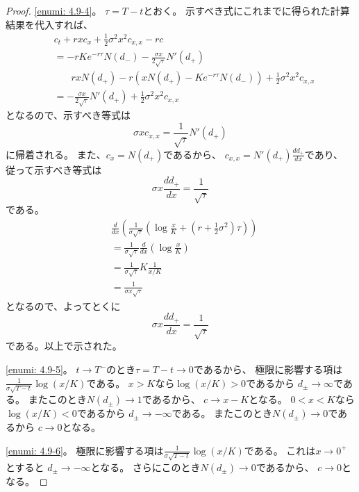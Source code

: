 \documentclass[uplatex]{jsarticle}
\theoremstyle{definition}
\begin{document}
\begin{proof}
  \ref{enumi: 4.9-4}。
  \(\tau = T-t\)とおく。
  示すべき式にこれまでに得られた計算結果を代入すれば、
  \begin{align*}
    &c_t + rxc_x
    + \frac{1}{2}\sigma^2x^2c_{x,x} - rc \\
    &= - rKe^{-r\tau}N(d_-) - \frac{\sigma x}{2\sqrt{\tau}}N'(d_+) \\
    &\ \ \ \ \ \ \ \
    rxN(d_+) - r\left(xN(d_+) - Ke^{-r\tau}N(d_-)\right)
    + \frac{1}{2}\sigma^2x^2c_{x,x} \\
    &= - \frac{\sigma x}{2\sqrt{\tau}}N'(d_+)
    + \frac{1}{2}\sigma^2x^2c_{x,x}
  \end{align*}
  となるので、示すべき等式は
  \[
  \sigma xc_{x,x} = \frac{1}{\sqrt{\tau}}N'(d_+)
  \]
  に帰着される。
  また、\(c_x = N(d_+)\)であるから、
  \(c_{x,x} = N'(d_+)\frac{dd_+}{dx}\)であり、
  従って示すべき等式は
  \[
  \sigma x\frac{dd_+}{dx} = \frac{1}{\sqrt{\tau}}
  \]
  である。
  \begin{align*}
    &\frac{d}{dx}\left(\frac{1}{\sigma\sqrt{\tau}} \left(
    \log \frac{x}{K} + \left( r + \frac{1}{2}\sigma^2\right) \tau
    \right) \right) \\
    &= \frac{1}{\sigma\sqrt{\tau}} \frac{d}{dx} \left(
    \log \frac{x}{K} \right) \\
    &= \frac{1}{\sigma\sqrt{\tau}} K \frac{1}{x/K} \\
    &= \frac{1}{\sigma x \sqrt{\tau}}
  \end{align*}
  となるので、よってとくに
  \[
  \sigma x\frac{dd_+}{dx} = \frac{1}{\sqrt{\tau}}
  \]
  である。以上で示された。

  \ref{enumi: 4.9-5}。
  \(t\to T^-\)のとき\(\tau = T-t \to 0\)であるから、
  極限に影響する項は\(\frac{1}{\sigma\sqrt{T-t}}\log(x/K)\)である。
  \(x > K\)なら\(\log(x/K) > 0\)であるから
  \(d_{\pm} \to \infty\)である。
  またこのとき\(N(d_\pm) \to 1\)であるから、
  \(c\to x - K\)となる。
  \(0 < x < K\)なら\(\log(x/K) < 0\)であるから
  \(d_{\pm} \to - \infty\)である。
  またこのとき\(N(d_{\pm}) \to 0\)であるから
  \(c\to 0\)となる。

  \ref{enumi: 4.9-6}。
  極限に影響する項は\(\frac{1}{\sigma\sqrt{T-t}}\log(x/K)\)である。
  これは\(x\to 0^+\)とすると
  \(d_{\pm}\to -\infty\)となる。
  さらにこのとき\(N(d_{\pm})\to 0\)であるから、
  \(c\to 0\)となる。


\end{proof}
\end{document}
